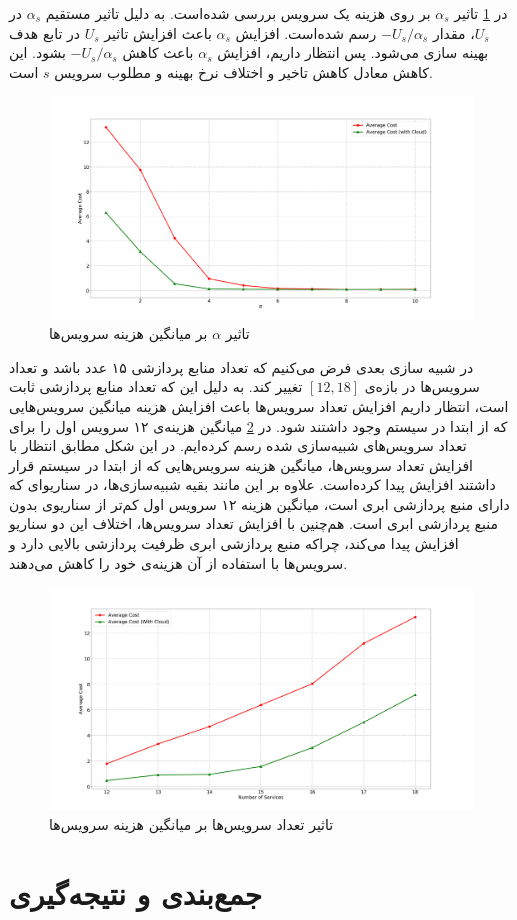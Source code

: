     در \cref{fig:many_to_many:sim8} تاثیر $\alpha_s$ بر روی هزینه یک سرویس بررسی شده‌است.
    به دلیل تاثیر مستقیم $\alpha_s$ در $U_s$، مقدار $-U_s/\alpha_s$ رسم شده‌است.
    افزایش $\alpha_s$ باعث افزایش تاثیر $U_s$ در تابع هدف بهینه سازی می‌شود.
    پس انتظار داریم، افزایش $\alpha_s$ باعث کاهش $-U_s/\alpha_s$ بشود.
    این کاهش معادل کاهش تاخیر و اختلاف نرخ بهینه و مطلوب سرویس $s$ است.

    \begin{figure}[H]
      \centerline{\includegraphics[width=17cm]{graphics/many_to_many/sim_8}}
      \caption{تاثیر $\alpha$ بر میانگین هزینه سرویس‌ها}
      \label{fig:many_to_many:sim8}
    \end{figure}

    در شبیه سازی بعدی فرض می‌کنیم که تعداد منابع پردازشی ۱۵ عدد باشد و تعداد سرویس‌ها در بازه‌ی $[12,18]$ تغییر کند.
    به دلیل این که تعداد منابع پردازشی ثابت است، انتظار داریم افزایش تعداد سرویس‌ها باعث افزایش هزینه میانگین سرویس‌هایی که از ابتدا در سیستم وجود داشتند شود.
    در \cref{fig:many_to_many:sim9} میانگین هزینه‌ی ۱۲ سرویس اول را برای تعداد سرویس‌های شبیه‌سازی شده رسم کرده‌ایم.
    در این شکل مطابق انتظار با افزایش تعداد سرویس‌ها، میانگین هزینه سرویس‌هایی که از ابتدا در سیستم قرار داشتند افزایش پیدا کرده‌است.
    علاوه بر این مانند بقیه شبیه‌سازی‌ها، در سناریو‌ای که دارای منبع پردازشی ابری است، میانگین هزینه ۱۲ سرویس اول کم‌تر از سناریو‌ی بدون منبع پردازشی ابری است.
    هم‌چنین با افزایش تعداد سرویس‌ها، اختلاف این دو سناریو افزایش پیدا می‌کند، چراکه منبع پردازشی ابری ظرفیت پردازشی بالایی دارد و سرویس‌ها با استفاده از آن هزینه‌ی خود را کاهش می‌دهند.

    \begin{figure}[H]
      \centerline{\includegraphics[width=17cm]{graphics/many_to_many/sim_9}}
      \caption{تاثیر تعداد سرویس‌ها بر میانگین هزینه سرویس‌ها}
      \label{fig:many_to_many:sim9}
    \end{figure}

  \section{جمع‌بندی و نتیجه‌گیری}
    

